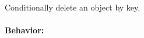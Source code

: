 Conditionally delete an object by key.

\paragraph{Behavior:}
\begin{itemize}[noitemsep]


\end{itemize}
